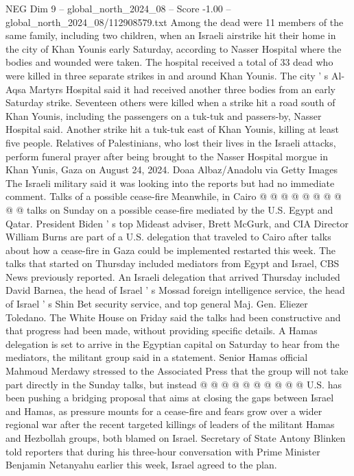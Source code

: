 \begin{textsample}{NEG Dim 9 – global\_north\_2024\_08 – Score -1.00 – global\_north\_2024\_08/112908579.txt}  \label{ex:f9_neg_262}
Among the dead were 11 members of the same family, including two children, when an Israeli airstrike hit their home in the city of Khan Younis early Saturday, according to Nasser Hospital where the bodies and wounded were taken.
The hospital received a total of 33 dead who were killed in three separate strikes in and around Khan Younis.
The city ' s Al-Aqsa Martyrs Hospital said it had received another three bodies from an early Saturday strike.
Seventeen others were killed when a strike hit a road south of Khan Younis, including the passengers on a tuk-tuk and passers-by, Nasser Hospital said.
Another strike hit a tuk-tuk east of Khan Younis, killing at least five people.
Relatives of Palestinians, who lost their lives in the Israeli attacks, perform funeral prayer after being brought to the Nasser Hospital morgue in Khan Yunis, Gaza on August 24, 2024.
Doaa Albaz/Anadolu via Getty Images The Israeli military said it was looking into the reports but had no immediate comment.
Talks of a possible cease-fire Meanwhile, in Cairo @ @ @ @ @ @ @ @ @ @ talks on Sunday on a possible cease-fire mediated by the U.S.
Egypt and Qatar.
President Biden ' s top Mideast adviser, Brett McGurk, and CIA Director William Burns are part of a U.S. delegation that traveled to Cairo after talks about how a cease-fire in Gaza could be implemented restarted this week.
The talks that started on Thursday included mediators from Egypt and Israel, CBS News previously reported.
An Israeli delegation that arrived Thursday included David Barnea, the head of Israel ' s Mossad foreign intelligence service, the head of Israel ' s Shin Bet security service, and top general Maj.
Gen.
Eliezer Toledano.
The White House on Friday said the talks had been constructive and that progress had been made, without providing specific details.
A Hamas delegation is set to arrive in the Egyptian capital on Saturday to hear from the mediators, the militant group said in a statement.
Senior Hamas official Mahmoud Merdawy stressed to the Associated Press that the group will not take part directly in the Sunday talks, but instead @ @ @ @ @ @ @ @ @ @ U.S. has been pushing a bridging proposal that aims at closing the gaps between Israel and Hamas, as pressure mounts for a cease-fire and fears grow over a wider regional war after the recent targeted killings of leaders of the militant Hamas and Hezbollah groups, both blamed on Israel.
Secretary of State Antony Blinken told reporters that during his three-hour conversation with Prime Minister Benjamin Netanyahu earlier this week, Israel agreed to the plan.

\end{textsample}
